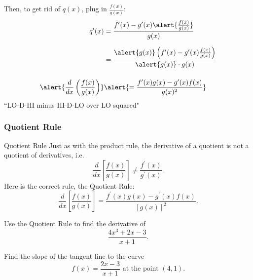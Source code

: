 \documentclass[cal1spr16Lectures.tex]{subfiles}
\begin{document}
\begin{frame}{}\footnotesize
Then, to get rid of $q(x)$, plug in $\frac{f(x)}{g(x)}$:
\begin{align*}
q^{\prime}(x) &= \frac{f^{\prime}(x)-g^{\prime}(x)\alert{\frac{f(x)}{g(x)}}}{g(x)} \\[0.5pc]
 &= \frac{\alert{g(x)} \left( f^{\prime}(x)-g^{\prime}(x)\frac{f(x)}{g(x)} \right)}{\alert{g(x)}\cdot g(x)} \\[1pc]
\alert{\frac{d}{dx}\left(\frac{f(x)}{g(x)}\right)} & \alert{=\frac{f^{\prime}(x) g(x)-g^{\prime}(x)f(x)}{g(x)^2}}
\end{align*}
``LO-D-HI minus HI-D-LO  over LO squared"
\end{frame}

\subsubsection{Quotient Rule}

\begin{frame}{\small Quotient Rule}
Just as with the product rule, the derivative of a quotient is not a quotient of derivatives, i.e.
\[\frac{d}{dx} \left[ \frac{f(x)}{g(x)}\right] \ne \frac{f^{\prime}(x)}{g^{\prime}(x)}.\]
Here is the correct rule, the Quotient Rule:
\[\frac{d}{dx} \left[ \frac{f(x)}{g(x)}\right] = \frac{f^{\prime}(x) g(x)-g^{\prime}(x) f(x)}{[g(x)]^2}.\]
\end{frame}

\begin{frame}
\begin{exe} Use the Quotient Rule to find the derivative of 
\[\frac{4x^3+2x-3}{x+1}.\]
\end{exe}
\begin{exe} Find the slope of the tangent line to the curve 
\[f(x)=\frac{2x-3}{x+1}\text{ at the point }(4,1).\] 
\end{exe}
\end{frame}
\end{document}
